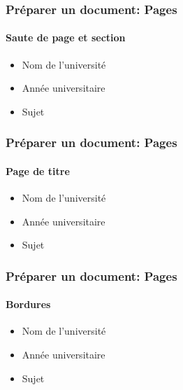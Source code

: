 \documentclass[xcolor=table]{beamer}
\begin{document}
\begin{frame}[t]
\frametitle{Préparer un document: Pages}
\framesubtitle{Saute de page et section}

\begin{minipage}{0.38\textwidth}
\begin{itemize}
\item Nom de l'université 
\item Année universitaire
\item Sujet
\end{itemize}
\end{minipage}
\begin{minipage}{0.6\textwidth}

\vspace{6pt}
\end{minipage}

\end{frame}

\begin{frame}[t]
\frametitle{Préparer un document: Pages}
\framesubtitle{Page de titre}

\begin{minipage}{0.38\textwidth}
\begin{itemize}
\item Nom de l'université 
\item Année universitaire
\item Sujet
\end{itemize}
\end{minipage}
\begin{minipage}{0.6\textwidth}
\end{minipage}

\end{frame}

\begin{frame}[t]
\frametitle{Préparer un document: Pages}
\framesubtitle{Bordures}

\begin{minipage}{0.43\textwidth}
\begin{itemize}
\item Nom de l'université 
\item Année universitaire
\item Sujet
\end{itemize}
\end{minipage}
\begin{minipage}{0.55\textwidth}
\end{minipage}

\end{frame}
\end{document}

